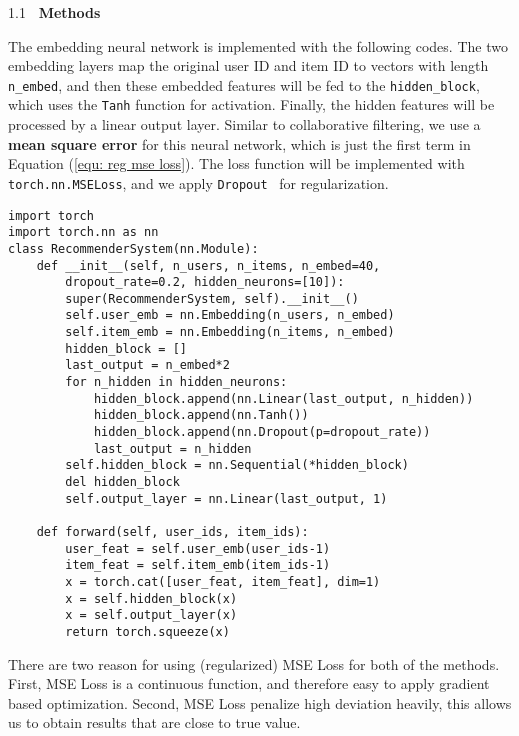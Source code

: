 \documentclass[a4paper,11pt]{article} %
\newcommand{\lineSpace}{1.1}
\newcounter{rSection}
\newenvironment{rSection}[1]{ %
\refstepcounter{rSection}
\begin{spacing}{\lineSpace}
  {\bf \large \therSection~#1 \hfill}  %
	\vspace{0.25em}

}{
\vspace{1em}
\end{spacing}
}
\begin{document}
\begin{rSection}{Methods}
The embedding neural network is implemented with the following codes. 
The two embedding layers map the original user ID and item ID to vectors with length \texttt{n_embed}, and then these embedded features will be fed to the \texttt{hidden_block}, which uses the \texttt{Tanh} function for activation.
Finally, the hidden features will be processed by a linear output layer.
Similar to collaborative filtering, we use a \textbf{mean square error} for this neural network, which is just the first term in Equation (\ref{equ: reg mse loss}).
The loss function will be implemented with \texttt{torch.nn.MSELoss}, and we apply \texttt{Dropout}~\cite{hinton2012dropout} for regularization. 

\begin{verbatim}
import torch 
import torch.nn as nn
class RecommenderSystem(nn.Module):
    def __init__(self, n_users, n_items, n_embed=40, 
		dropout_rate=0.2, hidden_neurons=[10]):
        super(RecommenderSystem, self).__init__()
        self.user_emb = nn.Embedding(n_users, n_embed)
        self.item_emb = nn.Embedding(n_items, n_embed)
        hidden_block = []
        last_output = n_embed*2
        for n_hidden in hidden_neurons:
            hidden_block.append(nn.Linear(last_output, n_hidden))
            hidden_block.append(nn.Tanh())
            hidden_block.append(nn.Dropout(p=dropout_rate))
            last_output = n_hidden
        self.hidden_block = nn.Sequential(*hidden_block)
        del hidden_block
        self.output_layer = nn.Linear(last_output, 1)
        
    def forward(self, user_ids, item_ids):
        user_feat = self.user_emb(user_ids-1)
        item_feat = self.item_emb(item_ids-1)
        x = torch.cat([user_feat, item_feat], dim=1)
        x = self.hidden_block(x)
        x = self.output_layer(x)
        return torch.squeeze(x)
\end{verbatim}

There are two reason for using (regularized) MSE Loss for both of the methods.
First, MSE Loss is a continuous function, and therefore easy to apply gradient based optimization.
Second, MSE Loss penalize high deviation heavily, this allows us to obtain results that are close to true value.

\end{rSection}
\end{document}
